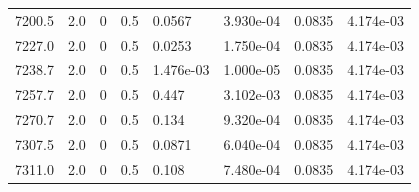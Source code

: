 \documentclass[preview]{standalone}
\begin{document}
{{{{{{{\begin{tabular}{L{1.2cm}C{1.2cm} C{0.3cm}C{0.5cm} C{1.4cm}C{1.4cm} C{1.4cm}C{1.4cm}}
  7200.5  &   2.0  & 0     & 0.5 &  0.0567  & 3.930e-04  & 0.0835 &  4.174e-03   \\ 
  7227.0  &   2.0  & 0     & 0.5 &  0.0253  & 1.750e-04  & 0.0835 &  4.174e-03   \\ 
  7238.7  &   2.0  & 0     & 0.5 &  1.476e-03  & 1.000e-05  & 0.0835 &  4.174e-03   \\ 
  7257.7  &   2.0  & 0     & 0.5 &  0.447  & 3.102e-03  & 0.0835 &  4.174e-03   \\ 
  7270.7  &   2.0  & 0     & 0.5 &  0.134  & 9.320e-04  & 0.0835 &  4.174e-03   \\ 
  7307.5  &   2.0  & 0     & 0.5 &  0.0871  & 6.040e-04  & 0.0835 &  4.174e-03   \\ 
  7311.0  &   2.0  & 0     & 0.5 &  0.108  & 7.480e-04  & 0.0835 &  4.174e-03   \\ 
\hline 
\end{tabular} 

}}}}}}}
\end{document}
